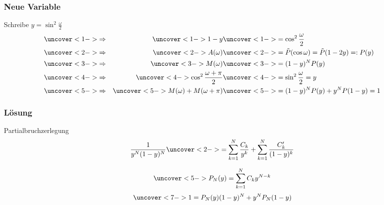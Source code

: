 %
%
\begin{frame}
\frametitle{Neue Variable}
\begin{block}{Schreibe $y=\sin^2\frac{\omega}2$}
\vspace{-20pt}
\begin{align}
&\uncover<1->{\Rightarrow}&
\uncover<1->{1-y}&\uncover<1->{= \cos^2\frac{\omega}2}
\notag
\\
&\uncover<2->{\Rightarrow}&
\uncover<2->{A(\omega)}&\uncover<2->{=\tilde{P}(\cos\omega)=\tilde{P}(1-2y)=:P(y)}
\notag
\\
&\uncover<3->{\Rightarrow}&
\uncover<3->{M(\omega)}&\uncover<3->{=(1-y)^N P(y)}
\notag
\\
&\uncover<4->{\Rightarrow}&
\uncover<4->{\cos^2\frac{\omega+\pi}2}&\uncover<4->{=\sin^2\frac{\omega}2=y}
\notag
\\
&\uncover<5->{\Rightarrow}&
\uncover<5->{M(\omega)+M(\omega+\pi)}&\uncover<5->{= (1-y)^N P(y) + y^N P(1-y) = 1}
\label{algcond}
\end{align}
\end{block}
\end{frame}

%
%
%
\begin{frame}
\frametitle{Lösung}
\begin{block}{Partialbruchzerlegung}
\[
\frac{1}{y^N(1-y)^N}
\uncover<2->{=
\sum_{k=1}^N \frac{\mathstrut C_k}{\mathstrut y^k}
+
\sum_{k=1}^N \frac{\mathstrut C_k'}{\mathstrut (1-y)^k}
}
\]
\end{block}
\[
\uncover<5->{P_N(y) = \sum_{k=1}^N C_ky^{N-k}}
\]
\[
\uncover<7->{1=
P_N(y) (1-y)^N + y^N P_N(1-y)}
\]
\end{frame}
